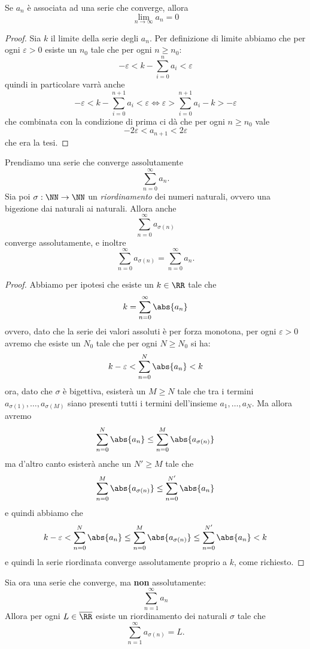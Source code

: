 \documentclass[11pt]{scrartcl}
\begin{document}
  \begin{lemma}\label{serie:Una serie convergente è una successione infinitesima}
  	Se $a_n$ è associata ad una serie che converge, allora
  	$$\lim_{n\to\infty}a_n=0$$
  \end{lemma}
  \begin{proof}
  	Sia $k$ il limite della serie degli $a_n$. Per definizione di limite abbiamo che per ogni $\varepsilon>0$ esiste un $n_0$ tale che per ogni $n\ge n_0$:
  	$$-\varepsilon<k-\sum_{i=0}^{n}a_i<\varepsilon$$
  	quindi in particolare varrà anche
  	$$-\varepsilon<k-\sum_{i=0}^{n+1}a_i<\varepsilon \iff \varepsilon>\sum_{i=0}^{n+1}a_i-k>-\varepsilon$$
  	che combinata con la condizione di prima ci dà che per ogni $n\ge n_0$ vale
  	$$-2\varepsilon < a_{n+1}<2\varepsilon$$
  	che era la tesi.
  \end{proof}
  \begin{theorem}
  	Prendiamo una serie che converge assolutamente
  	$$\sum_{n=0}^{\infty}a_n.$$
  	Sia poi $\sigma:\NN\to\NN$ un \textit{riordinamento} dei numeri naturali, ovvero una bigezione dai naturali ai naturali. Allora anche
  	$$\sum_{n=0}^\infty a_{\sigma(n)}$$
  	converge assolutamente, e inoltre
  	$$\sum_{n=0}^\infty a_{\sigma(n)}=\sum_{n=0}^{\infty}a_n.$$
  \end{theorem}
  \begin{proof}
  	Abbiamo per ipotesi che esiste un $k\in \RR$ tale che 
  	$$k=\sum_{n=0}^{\infty}\abs{a_{n}}$$
  	ovvero, dato che la serie dei valori assoluti è per forza monotona, per ogni $\varepsilon>0$ avremo che esiste un $N_0$ tale che per ogni $N\ge N_0$ si ha:
  	$$k-\varepsilon<\sum_{n=0}^{N}\abs{a_n}<k$$
  	ora, dato che $\sigma$ è bigettiva, esisterà un $M\ge N$ tale che tra i termini $a_{\sigma(1)},\dots,a_{\sigma(M)}$ siano presenti tutti i termini dell'insieme $a_1,\dots,a_N$. Ma allora avremo
  	$$\sum_{n=0}^{N}\abs{a_n}\le \sum_{n=0}^{M}\abs{a_{\sigma(n)}}$$
  	ma d'altro canto esisterà anche un $N'\ge M$ tale che
  	$$\sum_{n=0}^{M}\abs{a_{\sigma(n)}} \le \sum_{n=0}^{N'}\abs{a_n}$$
  	e quindi abbiamo che 
  	$$k-\varepsilon<\sum_{n=0}^{N}\abs{a_n}\le \sum_{n=0}^{M}\abs{a_{\sigma(n)}}\le \sum_{n=0}^{N'}\abs{a_n} < k$$
  	e quindi la serie riordinata converge assolutamente proprio a $k$, come richiesto.
  \end{proof}
  \begin{theorem}[Riemann]
  	Sia ora una serie che converge, ma \textbf{non} assolutamente:
  	$$\sum_{n=1}^{\infty}a_n$$
  	Allora per ogni $L\in\overline{\RR}$ esiste un riordinamento dei naturali $\sigma$ tale che 
  	$$\sum_{n=1}^{\infty}a_{\sigma(n)}=L.$$
  \end{theorem}
\end{document}
